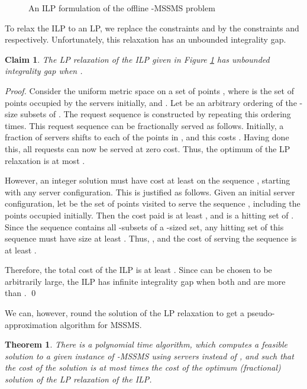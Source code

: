 \documentclass[11pt]{article}
\theoremstyle{plain}\newtheorem{theorem}{Theorem}
\newtheorem{claim}{Claim}
\theoremstyle{definition}
\theoremstyle{remark}
\begin{document}
\begin{figure}[h]

\caption{An ILP formulation of the offline -MSSMS problem}\label{fig_ilp}
\end{figure}

To relax the ILP to an LP, we replace the constraints  and  by the constraints  and  respectively. Unfortunately, this relaxation has an unbounded integrality gap.

\begin{claim}
The LP relaxation of the ILP given in Figure \ref{fig_ilp} has unbounded integrality gap when .
\end{claim}

\begin{proof}
Consider the uniform metric space on a set of points , where  is the set of  points occupied by the servers initially, and .
Let  be an arbitrary ordering of the -size subsets of . The request sequence is constructed by repeating this ordering  times. This request sequence can be fractionally served as follows. Initially, a  fraction of servers shifts to each of the  points in , and this costs . Having done this, all requests can now be served at zero cost. Thus, the optimum of the LP relaxation is at most . 

However, an integer solution must have cost at least  on the sequence , starting with any server configuration. This is justified as follows. 
Given an initial server configuration, let  be the set of points visited to serve the sequence , including the points occupied initially. Then the cost paid is at least , and  is a hitting set of . Since the sequence  contains all -subsets of a -sized set, any hitting set of this sequence must have size at least . Thus, , and the cost of serving the sequence is at least .

Therefore, the total cost of the ILP is at least . Since  can be chosen to be arbitrarily large, the ILP has infinite integrality gap when both  and  are more than . \qed
\end{proof}

We can, however, round the solution of the LP relaxation to get a pseudo-approximation algorithm for MSSMS.

\begin{theorem}
There is a polynomial time algorithm, which computes a feasible solution to a given instance of -MSSMS using  servers instead of , and such that the cost of the solution is at most  times the cost of the optimum (fractional) solution of the LP relaxation of the ILP. \end{theorem}
\end{document}
